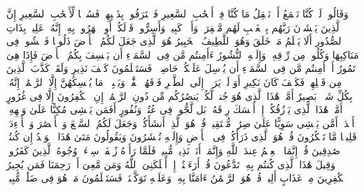 \startbuffer[\q:67:10]
وَقَالُوا۟ لَوۡ كُنَّا نَسۡمَعُ أَوۡ نَعۡقِلُ مَا كُنَّا فِیۤ أَصۡحَٰبِ ٱلسَّعِیرِ%
\stopbuffer
\startbuffer[\q:67:11]
فَٱعۡتَرَفُوا۟ بِذَنۢبِهِمۡ فَسُحۡقࣰا لِّأَصۡحَٰبِ ٱلسَّعِیرِ%
\stopbuffer
\startbuffer[\q:67:12]
إِنَّ ٱلَّذِینَ یَخۡشَوۡنَ رَبَّهُم بِٱلۡغَیۡبِ لَهُم مَّغۡفِرَةࣱ وَأَجۡرࣱ كَبِیرࣱ%
\stopbuffer
\startbuffer[\q:67:13]
وَأَسِرُّوا۟ قَوۡلَكُمۡ أَوِ ٱجۡهَرُوا۟ بِهِۦۤۖ إِنَّهُۥ عَلِیمُۢ بِذَاتِ ٱلصُّدُورِ%
\stopbuffer
\startbuffer[\q:67:14]
أَلَا یَعۡلَمُ مَنۡ خَلَقَ وَهُوَ ٱللَّطِیفُ ٱلۡخَبِیرُ%
\stopbuffer
\startbuffer[\q:67:15]
هُوَ ٱلَّذِی جَعَلَ لَكُمُ ٱلۡأَرۡضَ ذَلُولࣰا فَٱمۡشُوا۟ فِی مَنَاكِبِهَا وَكُلُوا۟ مِن رِّزۡقِهِۦۖ وَإِلَیۡهِ ٱلنُّشُورُ%
\stopbuffer
\startbuffer[\q:67:16]
ءَأَمِنتُم مَّن فِی ٱلسَّمَاۤءِ أَن یَخۡسِفَ بِكُمُ ٱلۡأَرۡضَ فَإِذَا هِیَ تَمُورُ%
\stopbuffer
\startbuffer[\q:67:17]
أَمۡ أَمِنتُم مَّن فِی ٱلسَّمَاۤءِ أَن یُرۡسِلَ عَلَیۡكُمۡ حَاصِبࣰاۖ فَسَتَعۡلَمُونَ كَیۡفَ نَذِیرِ%
\stopbuffer
\startbuffer[\q:67:18]
وَلَقَدۡ كَذَّبَ ٱلَّذِینَ مِن قَبۡلِهِمۡ فَكَیۡفَ كَانَ نَكِیرِ%
\stopbuffer
\startbuffer[\q:67:19]
أَوَ لَمۡ یَرَوۡا۟ إِلَى ٱلطَّیۡرِ فَوۡقَهُمۡ صَٰۤفَّٰتࣲ وَیَقۡبِضۡنَۚ مَا یُمۡسِكُهُنَّ إِلَّا ٱلرَّحۡمَٰنُۚ إِنَّهُۥ بِكُلِّ شَیۡءِۭ بَصِیرٌ%
\stopbuffer
\startbuffer[\q:67:20]
أَمَّنۡ هَٰذَا ٱلَّذِی هُوَ جُندࣱ لَّكُمۡ یَنصُرُكُم مِّن دُونِ ٱلرَّحۡمَٰنِۚ إِنِ ٱلۡكَٰفِرُونَ إِلَّا فِی غُرُورٍ%
\stopbuffer
\startbuffer[\q:67:21]
أَمَّنۡ هَٰذَا ٱلَّذِی یَرۡزُقُكُمۡ إِنۡ أَمۡسَكَ رِزۡقَهُۥۚ بَل لَّجُّوا۟ فِی عُتُوࣲّ وَنُفُورٍ%
\stopbuffer
\startbuffer[\q:67:22]
أَفَمَن یَمۡشِی مُكِبًّا عَلَىٰ وَجۡهِهِۦۤ أَهۡدَىٰۤ أَمَّن یَمۡشِی سَوِیًّا عَلَىٰ صِرَٰطࣲ مُّسۡتَقِیمࣲ%
\stopbuffer
\startbuffer[\q:67:23]
قُلۡ هُوَ ٱلَّذِیۤ أَنشَأَكُمۡ وَجَعَلَ لَكُمُ ٱلسَّمۡعَ وَٱلۡأَبۡصَٰرَ وَٱلۡأَفۡءِدَةَۚ قَلِیلࣰا مَّا تَشۡكُرُونَ%
\stopbuffer
\startbuffer[\q:67:24]
قُلۡ هُوَ ٱلَّذِی ذَرَأَكُمۡ فِی ٱلۡأَرۡضِ وَإِلَیۡهِ تُحۡشَرُونَ%
\stopbuffer
\startbuffer[\q:67:25]
وَیَقُولُونَ مَتَىٰ هَٰذَا ٱلۡوَعۡدُ إِن كُنتُمۡ صَٰدِقِینَ%
\stopbuffer
\startbuffer[\q:67:26]
قُلۡ إِنَّمَا ٱلۡعِلۡمُ عِندَ ٱللَّهِ وَإِنَّمَاۤ أَنَا۠ نَذِیرࣱ مُّبِینࣱ%
\stopbuffer
\startbuffer[\q:67:27]
فَلَمَّا رَأَوۡهُ زُلۡفَةࣰ سِیۤءَتۡ وُجُوهُ ٱلَّذِینَ كَفَرُوا۟ وَقِیلَ هَٰذَا ٱلَّذِی كُنتُم بِهِۦ تَدَّعُونَ%
\stopbuffer
\startbuffer[\q:67:28]
قُلۡ أَرَءَیۡتُمۡ إِنۡ أَهۡلَكَنِیَ ٱللَّهُ وَمَن مَّعِیَ أَوۡ رَحِمَنَا فَمَن یُجِیرُ ٱلۡكَٰفِرِینَ مِنۡ عَذَابٍ أَلِیمࣲ%
\stopbuffer
\startbuffer[\q:67:29]
قُلۡ هُوَ ٱلرَّحۡمَٰنُ ءَامَنَّا بِهِۦ وَعَلَیۡهِ تَوَكَّلۡنَاۖ فَسَتَعۡلَمُونَ مَنۡ هُوَ فِی ضَلَٰلࣲ مُّبِینࣲ%
\stopbuffer
\startbuffer[\q:67:30]
